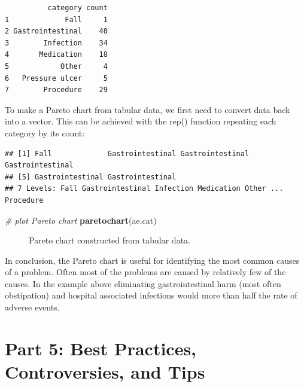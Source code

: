 \documentclass[
]{book}
\makeatletter
\newenvironment{Shaded}{\begin{snugshade}}{\end{snugshade}}
\newcommand{\CommentTok}[1]{\textcolor[rgb]{0.56,0.35,0.01}{\textit{#1}}}
\newcommand{\FunctionTok}[1]{\textcolor[rgb]{0.13,0.29,0.53}{\textbf{#1}}}
\newcommand{\NormalTok}[1]{#1}
\newcommand{\OtherTok}[1]{\textcolor[rgb]{0.56,0.35,0.01}{#1}}
\newcommand{\SpecialCharTok}[1]{\textcolor[rgb]{0.81,0.36,0.00}{\textbf{#1}}}
\newcommand*\pandocbounded[1]{%
  \sbox\pandoc@box{#1}%
  \Gscale@div\@tempa{\textheight}{\dimexpr\ht\pandoc@box+\dp\pandoc@box\relax}%
  \Gscale@div\@tempb{\linewidth}{\wd\pandoc@box}%
  \ifdim\@tempb\p@<\@tempa\p@\let\@tempa\@tempb\fi%
  \ifdim\@tempa\p@<\p@\scalebox{\@tempa}{\usebox\pandoc@box}%
  \else\usebox{\pandoc@box}%
  \fi%
}
\makeatother
\begin{document}
\begin{verbatim}
          category count
1             Fall     1
2 Gastrointestinal    40
3        Infection    34
4       Medication    18
5            Other     4
6   Pressure ulcer     5
7        Procedure    29
\end{verbatim}

To make a Pareto chart from tabular data, we first need to convert data back into a vector. This can be achieved with the rep() function repeating each category by its count:

\begin{Shaded}
\end{Shaded}

\begin{verbatim}
## [1] Fall             Gastrointestinal Gastrointestinal Gastrointestinal
## [5] Gastrointestinal Gastrointestinal
## 7 Levels: Fall Gastrointestinal Infection Medication Other ... Procedure
\end{verbatim}

\begin{Shaded}
\begin{Highlighting}[]
\CommentTok{\# plot Pareto chart}
\FunctionTok{paretochart}\NormalTok{(ae.cat)}
\end{Highlighting}
\end{Shaded}

\begin{figure}
\centering
\pandocbounded{}
\caption{\label{fig:pareto-fig3}Pareto chart constructed from tabular data.}
\end{figure}

In conclusion, the Pareto chart is useful for identifying the most common causes of a problem. Often most of the problems are caused by relatively few of the causes. In the example above eliminating gastrointestinal harm (most often obstipation) and hospital associated infections would more than half the rate of adverse events.

\part*{Part 5: Best Practices, Controversies, and Tips}\label{part-part-5-best-practices-controversies-and-tips}
\end{document}
